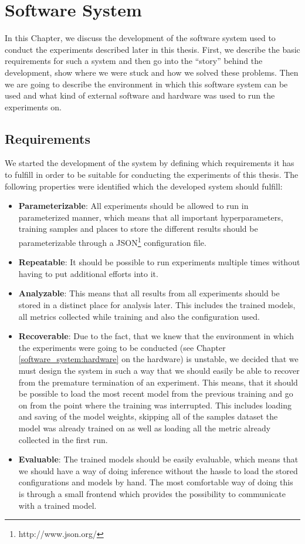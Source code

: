 \chapter{Software System}
\label{software_system}
In this Chapter, we discuss the development of the software system used to conduct the experiments described later in this thesis. First, we describe the basic requirements for such a system and then go into the ``story'' behind the development, show where we were stuck and how we solved these problems. Then we are going to describe the environment in which this software system can be used and what kind of external software and hardware was used to run the experiments on.

\section{Requirements}
We started the development of the system by defining which requirements it has to fulfill in order to be suitable for conducting the experiments of this thesis. The following properties were identified which the developed system should fulfill:

\begin{itemize}
	\item \textbf{Parameterizable}: All experiments should be allowed to run in parameterized manner, which means that all important hyperparameters, training samples and places to store the different results should be parameterizable through a JSON\footnote{http://www.json.org/} configuration file.
	\item \textbf{Repeatable}: It should be possible to run experiments multiple times without having to put additional efforts into it.
	\item \textbf{Analyzable}: This means that all results from all experiments should be stored in a distinct place for analysis later. This includes the trained models, all metrics collected while training and also the configuration used.
	\item \textbf{Recoverable}: Due to the fact, that we knew that the environment in which the experiments were going to be conducted (see Chapter \ref{software_system:hardware} on the hardware) is unstable, we decided that we must design the system in such a way that we should easily be able to recover from the premature termination of an experiment. This means, that it should be possible to load the most recent model from the previous training and go on from the point where the training was interrupted. This includes loading and saving of the model weights, skipping all of the samples dataset the model was already trained on as well as loading all the metric already collected in the first run.
	\item \textbf{Evaluable}: The trained models should be easily evaluable, which means that we should have a way of doing inference without the hassle to load the stored configurations and models by hand. The most comfortable way of doing this is through a small frontend which provides the possibility to communicate with a trained model.
\end{itemize}

